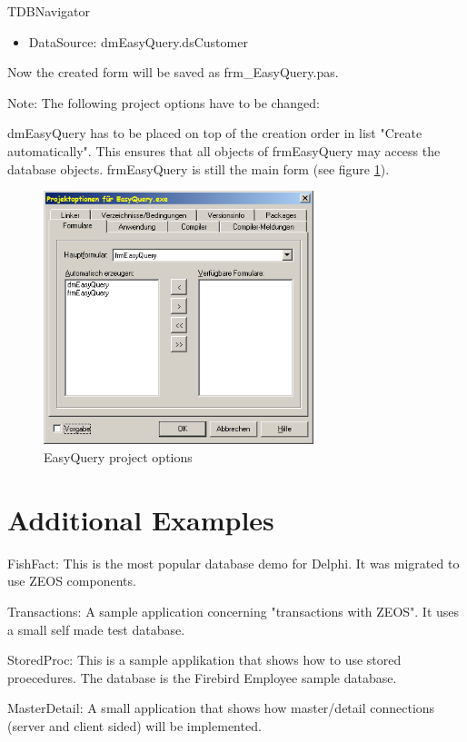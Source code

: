 \documentclass[a4paper,12pt,oneside]{book}
\begin{document}
TDBNavigator
\begin{itemize}
  \item DataSource: dmEasyQuery.dsCustomer
\end{itemize}

Now the created form will be saved as frm\_EasyQuery.pas.

Note: The following project options have to be changed:

dmEasyQuery has to be placed on top of the creation order in list "Create automatically".
This ensures that all objects of frmEasyQuery may access the database objects.
frmEasyQuery is still the main form (see figure \ref{fig:EasyQuery_ProjectOptions}).
	
\begin{figure}[htbp] 
  \centering
  \includegraphics[width=0.7\textwidth]{ZeosTutorial/EasyQuery_ProjectOptions.png}
  \caption{EasyQuery project options}
  \label{fig:EasyQuery_ProjectOptions}
\end{figure}

\chapter{Additional Examples}
FishFact:
This is the most popular database demo for Delphi. It was migrated to use ZEOS components.

Transactions:
A sample application concerning "transactions with ZEOS". It uses a small self made test database.

StoredProc:
This is a sample applikation that shows how to use stored proecedures. The database is the Firebird
Employee sample database.

MasterDetail:
A small application that shows how master/detail connections (server and client sided) will be implemented.
\end{document}
